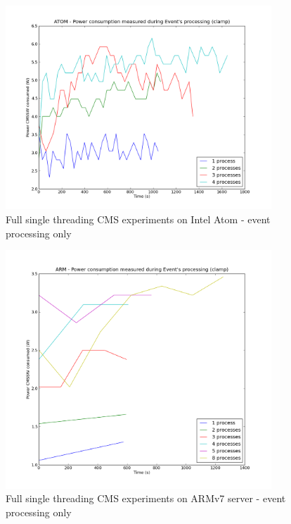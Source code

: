 \begin{figure}[h!]
  \centering
    \includegraphics[width=100mm]{"img/aalto/aalto_atomEvents"}
    \caption{Full single threading CMS experiments on Intel Atom - event
    \label{fig:aalto_atom_events}
processing only}
\end{figure}


\begin{figure}[h!]
  \centering
    \includegraphics[width=100mm]{"img/aalto/aalto_armEvents"}
    \caption{Full single threading CMS experiments on ARMv7 server - event
processing only}
    \label{fig:aalto_arm_events}
\end{figure}


